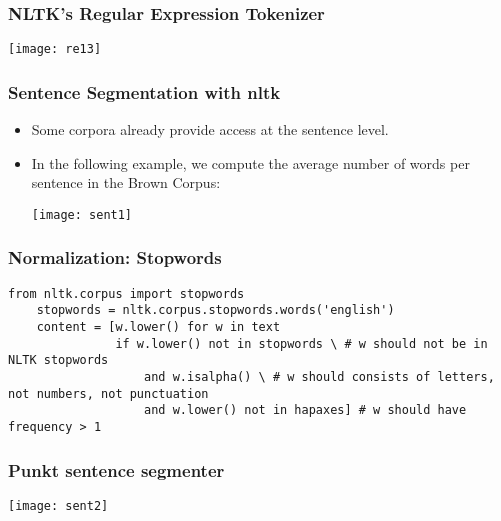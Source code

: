 \begin{frame}[fragile]
\frametitle{NLTK's Regular Expression Tokenizer }
\begin{center}
\texttt{[image: re13]}
\end{center}
\end{frame}


\begin{frame}[fragile]
\frametitle{ Sentence Segmentation with nltk }
\begin{itemize}
\item Some corpora already provide access at the sentence level. 
\item In the following example, we compute the average number of words per sentence in the Brown Corpus:
\begin{center}
\texttt{[image: sent1]}
\end{center}
\end{itemize}
\end{frame}

\begin{frame}[fragile]
\frametitle{Normalization: Stopwords}
\begin{lstlisting}
from nltk.corpus import stopwords
    stopwords = nltk.corpus.stopwords.words('english')
    content = [w.lower() for w in text 
               if w.lower() not in stopwords \ # w should not be in NLTK stopwords
                   and w.isalpha() \ # w should consists of letters, not numbers, not punctuation
                   and w.lower() not in hapaxes] # w should have frequency > 1 
\end{lstlisting}
\end{frame}

\begin{frame}[fragile]
\frametitle{Punkt sentence segmenter }
\begin{center}
\texttt{[image: sent2]}
\end{center}
\end{frame}




